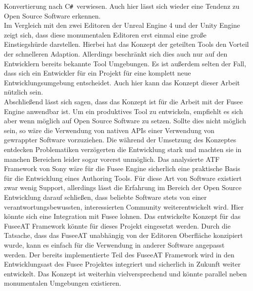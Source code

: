 \documentclass[pagesize, paper=a4, fontsize=12pt, titlepage=true, headings=small, headnosepline, abstractoff, liststotoc, nochapterprefix, plainheadsepline, twoside]{scrreprt}
\newcommand{\CSS}{C\texttt{\# }}
\begin{document}
Konvertierung nach \CSS verwiesen. Auch hier lässt sich wieder eine Tendenz zu Open Source Software erkennen.\\

Im Vergleich mit den zwei Editoren der Unreal Engine 4 und der Unity Engine zeigt sich, dass diese monumentalen Editoren erst einmal eine große Einstiegshürde darstellen. Hierbei hat das Konzept der geteilten Tools den Vorteil der schnelleren Adaption. Allerdings beschränkt sich dies auch nur auf den Entwicklern bereits bekannte Tool Umgebungen. Es ist außerdem selten der Fall, dass sich ein Entwickler für ein Projekt für eine komplett neue Entwicklungsumgebung entscheidet. Auch hier kann das Konzept dieser Arbeit nützlich sein.\\

Abschließend lässt sich sagen, dass das Konzept ist für die Arbeit mit der Fusee Engine anwendbar ist. Um ein produktives Tool zu entwickeln, empfiehlt es sich aber wenn möglich auf Open Source Software zu setzen. Sollte dies nicht möglich sein, so wäre die Verwendung von nativen APIs einer Verwendung von gewrappter Software vorzuziehen. Die während der Umsetzung des Konzeptes entdecken Problematiken verzögerten die Entwicklung stark und machten sie in manchen Bereichen leider sogar vorerst unmöglich. Das analysierte ATF Framework von Sony wäre für die Fusee Engine sicherlich eine praktische Basis für die Entwicklung eines Authoring Tools. Für diese Art von Software existiert zwar wenig Support, allerdings lässt die Erfahrung im Bereich der Open Source Entwicklung darauf schließen, dass beliebte Software stets von einer verantwortungsbewussten, interessierten Community weiterentwickelt wird. Hier könnte sich eine Integration mit Fusee lohnen. Das entwickelte Konzept für das FuseeAT Framework könnte für dieses Projekt eingesetzt werden. Durch die Tatsache, dass das FuseeAT unabhängig von der Editoren Oberfläche konzipiert wurde, kann es einfach für die Verwendung in anderer Software angepasst werden. Der bereits implementierte Teil des FuseeAT Framework wird in den Entwicklungsast des Fusee Projektes integriert und sicherlich in Zukunft weiter entwickelt. Das Konzept ist weiterhin vielversprechend und könnte parallel neben monumentalen Umgebungen existieren.
\end{document}
